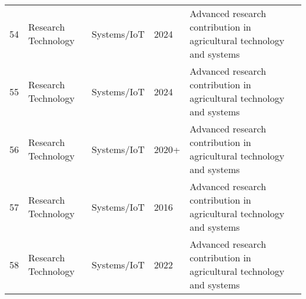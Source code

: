 \begin{table*}[htbp]
\begin{tabular}{p{}p{}p{}p{}p{}p{}}
 54 & Research Technology & Systems/IoT & 2024 & Advanced research contribution in agricultural technology and systems & \cite{zhang2024dragon} \\
 55 & Research Technology & Systems/IoT & 2024 & Advanced research contribution in agricultural technology and systems & \cite{zhang2024reconfigurable} \\
 56 & Research Technology & Systems/IoT & 2020+ & Advanced research contribution in agricultural technology and systems & \cite{zhao2013design} \\
 57 & Research Technology & Systems/IoT & 2016 & Advanced research contribution in agricultural technology and systems & \cite{zhao2016detecting} \\
 58 & Research Technology & Systems/IoT & 2022 & Advanced research contribution in agricultural technology and systems & \cite{zhou2022intelligent} \\
\bottomrule
\end{tabular}
\end{table*}